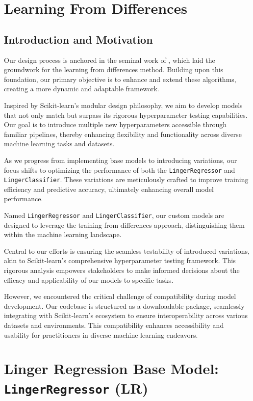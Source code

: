 \documentclass[a4paper, 12pt]{report}
\begin{document}
\section{Learning From Differences}
\subsection{Introduction and Motivation}

Our design process is anchored in the seminal work of \cite{learningFromDifferences2022}, which laid the groundwork for the learning from differences method. 
Building upon this foundation, our primary objective is to enhance and extend these algorithms, creating a more dynamic and adaptable framework.

Inspired by Scikit-learn's modular design philosophy, we aim to develop models that not only match but surpass its rigorous hyperparameter testing capabilities. 
Our goal is to introduce multiple new hyperparameters accessible through familiar pipelines, thereby enhancing flexibility and functionality across diverse 
machine learning tasks and datasets.

As we progress from implementing base models to introducing variations, our focus shifts to optimizing the performance of 
both the \texttt{LingerRegressor} and \texttt{LingerClassifier}. These variations are meticulously crafted to improve training efficiency and predictive accuracy, 
ultimately enhancing overall model performance.

Named \texttt{LingerRegressor} and \texttt{LingerClassifier}, our custom models are designed to leverage the training from differences approach, 
distinguishing them within the machine learning landscape.

Central to our efforts is ensuring the seamless testability of introduced variations, akin to Scikit-learn's comprehensive hyperparameter testing framework. 
This rigorous analysis empowers stakeholders to make informed decisions about the efficacy and applicability of our models to specific tasks.

However, we encountered the critical challenge of compatibility during model development. Our codebase is structured as a downloadable package, 
seamlessly integrating with Scikit-learn's ecosystem to ensure interoperability across various datasets and environments. 
This compatibility enhances accessibility and usability for practitioners in diverse machine learning endeavors.

\section{Linger Regression Base Model: \texttt{LingerRegressor} (LR)}
\label{sec:linger_regression_base_model}
\end{document}
